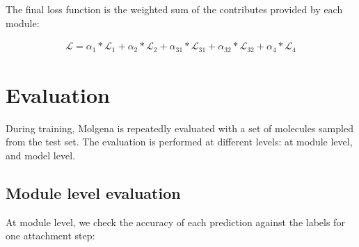 \documentclass{article}
\begin{document}
The final loss function is the weighted sum of the contributes provided by each module:

\begin{equation}
\begin{gathered}
\mathcal{L} = \alpha_1 * \mathcal{L}_1 +
    \alpha_2 * \mathcal{L}_2 +
    \alpha_{31} * \mathcal{L}_{31} +
    \alpha_{32} * \mathcal{L}_{32} +
    \alpha_4 * \mathcal{L}_4
\end{gathered}
\end{equation}


\section{Evaluation}

During training, Molgena is repeatedly evaluated with a set of molecules sampled from the test set.
The evaluation is performed at different levels: at module level, and model level.

\subsection{Module level evaluation}

At module level, we check the accuracy of each prediction against the labels for one attachment step:
\end{document}
